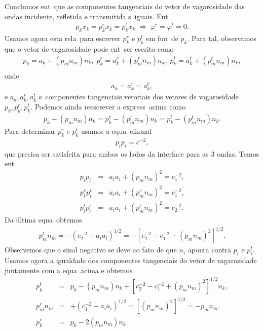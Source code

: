Conclu\ih mos ent\ao\ que as componentes tangenciais do vetor de
vagarosidade das ondas incidente, refletida e transmitida s\ao\ iguais.
Ent\ao\
\begin{eqnarray}
p_k x_k = p_k^r x_k = p_k^t x_k \; \Rightarrow \; \varphi^r = \varphi^t = 0.
\end{eqnarray}
Usamos agora esta rela\cao\ para escrever $p_k^r$ e $p_k^t$ em fun\cao\
de $p_k$. Para tal, observamos que o vetor de vagarosidade pode ent\ao\
ser escrito como
\begin{eqnarray}
p_k = a_k + (p_m n_m)n_k, \; p_k^r = a_k^r + (p_m^r n_m)n_k, \; p_k^t = a_k^t + (p_m^t n_m)n_k,\\
\end{eqnarray}
onde
\begin{eqnarray}
a_k = a_k^r = a_k^t,
\end{eqnarray}
e $a_k,a_k^r,a_k^t$ s\ao\ componentes tangenciais vetoriais dos vetores
de vagarosidade $p_k,p_k^r,p_k^t$. Podemos ainda reescrever a
express\ao\ acima como
\begin{eqnarray}
p_k - (p_m n_m)n_k = p_k^r - (p_m^r n_m)n_k = p_k^t - (p_m^t n_m)n_k.
\end{eqnarray}
Para determinar $p_k^r$ e $p_k^t$ usamos a equa\cao\ eikonal
\begin{eqnarray}
p_i p_i = c^{-2},
\end{eqnarray}
que precisa ser satisfeita para ambos os lados da interface para as 3
ondas. Temos ent\ao\
\begin{eqnarray}
p_i p_i &=& a_i a_i + (p_m n_m)^2 = c_1^{-2},\\
p_i^r p_i^r &=& a_i a_i + (p_m^r n_m)^2 = c_1^{-2},\\
p_i^t p_i^t &=& a_i a_i + (p_m^t n_m)^2 = c_2^{-2}.
\end{eqnarray}
Da \'ultima equa\cao\ obtemos
\begin{eqnarray}
p_m^t n_m = -(c_2^{-2} - a_i a_i)^{1/2} = - [c_2^{-2} - c_1^{-2} + (p_m n_m)^2]^{1/2}.
\end{eqnarray}
Observemos que o sinal negativo se deve ao fato de que $n_i$ aponta
contra $p_i$ e $p_i^t$. Usamos agora a igualdade dos componentes
tangenciais do vetor de vagarosidade juntamente com a equa\cao\ acima e
obtemos
\begin{eqnarray}
p_k^t &=& p_k - {(p_m n_m)n_k + [c_2^{-2} - c_1^{-2} + (p_m n_m)^2]^{1/2}}n_k,\\
p_m^r n_m &=& +(c_1^{-2} - a_i a_i)^{1/2} = [(p_m n_m)^2]^{1/2} = - p_m n_m,\\
p_k^r &=& p_k -2(p_m n_m)n_k.
\end{eqnarray}

